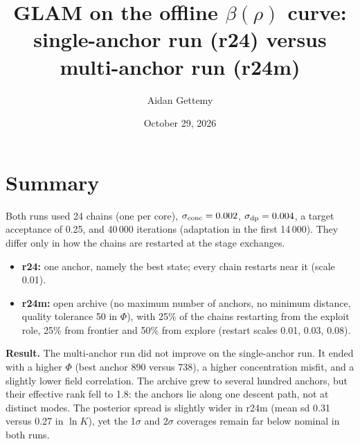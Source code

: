 \documentclass[11pt]{article}
\title{GLAM on the offline $\beta(\rho)$ curve:\\ single-anchor run (r24) versus multi-anchor run (r24m)}
\author{Aidan Gettemy}
\date{October 29, 2026}
\begin{document}
\maketitle

\section{Summary}
Both runs used 24 chains (one per core), $\sigma_{\rm conc}=0.002$, $\sigma_{\rm dp}=0.004$, a target acceptance of 0.25, and 40\,000 iterations (adaptation in the first 14\,000). They differ only in how the chains are restarted at the stage exchanges.
\begin{itemize}
\item \textbf{r24:} one anchor, namely the best state; every chain restarts near it (scale 0.01).
\item \textbf{r24m:} open archive (no maximum number of anchors, no minimum distance, quality tolerance 50 in $\Phi$), with 25\% of the chains restarting from the exploit role, 25\% from frontier and 50\% from explore (restart scales 0.01, 0.03, 0.08).
\end{itemize}
\textbf{Result.} The multi-anchor run did not improve on the single-anchor run. It ended with a higher $\Phi$ (best anchor 890 versus 738), a higher concentration misfit, and a slightly lower field correlation. The archive grew to several hundred anchors, but their effective rank fell to 1.8: the anchors lie along one descent path, not at distinct modes. The posterior spread is slightly wider in r24m (mean sd 0.31 versus 0.27 in $\ln K$), yet the 1$\sigma$ and 2$\sigma$ coverages remain far below nominal in both runs.
\end{document}
